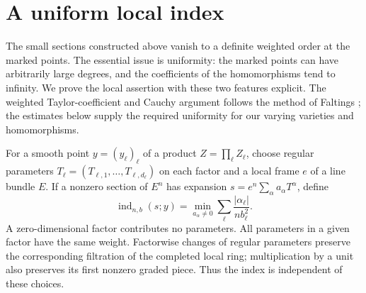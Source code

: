 \section{A uniform local index}
\label{sec:index}

The small sections constructed above vanish to a definite weighted order
at the marked points.  The essential issue is uniformity: the marked
points can have arbitrarily large degrees, and the coefficients of the
homomorphisms tend to infinity.  We prove the local assertion with these
two features explicit. The weighted Taylor-coefficient and Cauchy
argument follows the method of Faltings \cite[p.~560]{Faltings1991};
the estimates below supply the required uniformity for our varying
varieties and homomorphisms.

For a smooth point $y=(y_\ell)_\ell$ of a product
$Z=\prod_\ell Z_\ell$, choose regular parameters
$T_\ell=(T_{\ell,1},\ldots,T_{\ell,d_\ell})$ on each factor and a
local frame $e$ of a line bundle $E$.  If a nonzero section of $E^n$
has expansion $s=e^n\sum_\alpha a_\alpha T^\alpha$, define
\begin{equation}\label{eq:weighted-index}
 \operatorname{ind}_{n,b}(s;y)
 =\min_{a_\alpha\ne0}
       \sum_\ell\frac{|\alpha_\ell|}{n b_\ell^2}.
\end{equation}
A zero-dimensional factor contributes no parameters.  All parameters
in a given factor have the same weight.  Factorwise changes of regular
parameters preserve the corresponding filtration of the completed
local ring; multiplication by a unit also preserves its first nonzero
graded piece.  Thus the index is independent of these choices.

